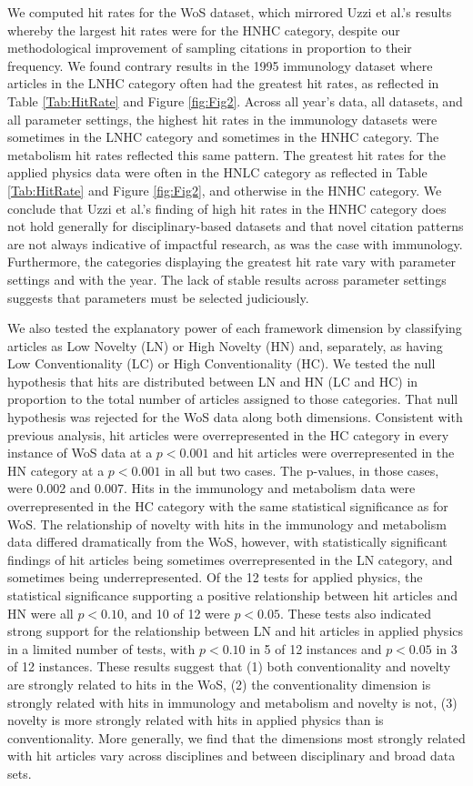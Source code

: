 \documentclass[NETN]{stjour}
\begin{document}
We computed hit rates for the WoS dataset, which mirrored Uzzi et al.'s results whereby the largest hit rates were for the HNHC category, despite our methodological improvement of sampling citations in proportion to their frequency. We found contrary results in the 1995 immunology dataset where articles in the LNHC category often had the greatest hit rates, as reflected in Table \ref{Tab:HitRate} and Figure \ref{fig:Fig2}.  Across all year's data, all datasets, and all parameter settings, the highest hit rates in the immunology datasets were sometimes in the LNHC category and sometimes in the HNHC category. The metabolism hit rates reflected this same pattern. The greatest hit rates for the applied physics data were often in the HNLC category as reflected in Table \ref{Tab:HitRate} and Figure \ref{fig:Fig2}, and otherwise in the HNHC category. We conclude that Uzzi et al.'s finding of high hit rates in the HNHC category does not hold generally for disciplinary-based datasets and that novel citation patterns are not always indicative of impactful research, as was the case with immunology. Furthermore, the categories displaying the greatest hit rate vary with parameter settings and with the year. The lack of stable results across parameter settings suggests that parameters must be selected judiciously.

We also tested the explanatory power of each framework dimension by classifying articles as Low Novelty (LN) or High Novelty (HN) and, separately, as having Low Conventionality (LC) or High Conventionality (HC).  We tested the null hypothesis that hits are distributed between LN and HN (LC and HC) in proportion to the total number of articles assigned to those categories.  That null hypothesis was rejected for the WoS data along both dimensions. Consistent with previous analysis, hit articles were overrepresented in the HC category in every instance of WoS data at a $p<0.001$ and hit articles were overrepresented in the HN category at a $p<0.001$ in all but two cases.  The p-values, in those cases, were 0.002 and 0.007.  Hits in the immunology and metabolism data were overrepresented in the HC category with the same statistical significance as for WoS. The relationship of novelty with hits in the immunology and metabolism data differed dramatically from the WoS, however, with statistically significant findings of hit articles being sometimes overrepresented in the LN category, and sometimes being underrepresented.  Of the 12 tests for applied physics, the statistical significance supporting a positive relationship between hit articles and HN were all $p<0.10$, and 10 of 12 were $p<0.05$.  These tests also indicated strong support for the relationship between LN and hit articles in applied physics in a limited number of tests, with $p<0.10$ in 5 of 12 instances and $p < 0.05$ in 3 of 12 instances. These results suggest that (1) both conventionality and novelty are strongly related to hits in the WoS, (2) the conventionality dimension is strongly related with hits in immunology and metabolism and novelty is not, (3) novelty is more strongly related with hits in applied physics than is conventionality. More generally, we find that the dimensions most strongly related with hit articles vary across disciplines and between disciplinary and broad data sets. 
\end{document}
